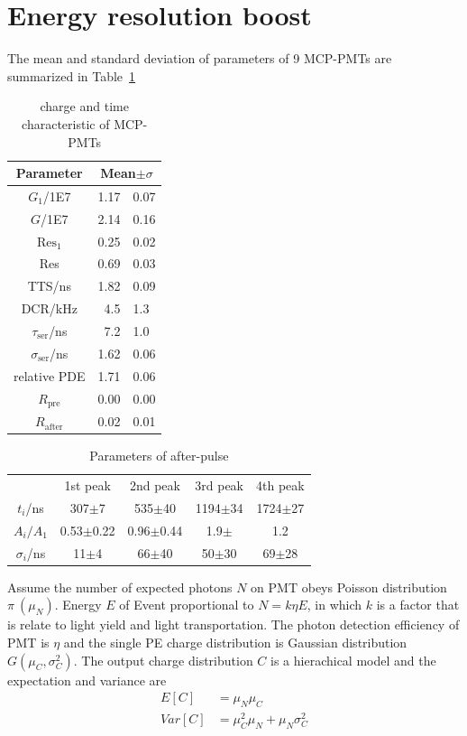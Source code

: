 \section{Energy resolution boost}
\label{Result}
The mean and standard deviation of parameters of 9 MCP-PMTs are summarized in Table~\ref{tab:summary}
\begin{table}
    \centering
    \caption{charge and time characteristic of MCP-PMTs}
    \label{tab:summary}
    \begin{tabular}{c| r @{$\pm$} l}
        Parameter&\multicolumn{2}{c}{Mean$\pm\sigma$}\\
        \hline
        $G_1$/1E7&1.17&0.07\\
        $G$/1E7&2.14&0.16\\
        $\mathrm{Res}_1$&0.25&0.02\\
        Res&0.69&0.03\\
        TTS/ns&1.82&0.09\\
        DCR/kHz&4.5&1.3\\
        $\tau_{\mathrm{ser}}$/ns&7.2&1.0\\
        $\sigma_{\mathrm{ser}}$/ns&1.62&0.06\\
        relative PDE&1.71&0.06\\
        $R_{\mathrm{pre}}$&0.00&0.00\\
        $R_{\mathrm{after}}$&0.02&0.01\\
        \hline
    \end{tabular}
\end{table}
\begin{table}
    \centering
    \caption{Parameters of after-pulse}
    \label{tab:afterpulse}
    \begin{tabular}{c|c|c|c|c}
        \hline
        &1st peak&2nd peak&3rd peak&4th peak\\
        $t_i$/ns&307$\pm$7&535$\pm$40&1194$\pm$34&1724$\pm$27\\
        $A_i/A_1$&0.53$\pm$0.22&0.96$\pm$0.44&1.9$\pm$&1.2\\
        $\sigma_i$/ns&11$\pm$4&66$\pm$40&50$\pm$30&69$\pm$28\\
        \hline
    \end{tabular}
\end{table}

Assume the number of expected photons $N$ on PMT obeys Poisson distribution $\pi~(\mu_N)$. Energy $E$ of Event proportional to $N=k\eta E$, in which $k$ is a factor that is relate to light yield and light transportation. The photon detection efficiency of PMT is $\eta$ and the single PE charge distribution is Gaussian distribution $G(\mu_C,\sigma_C^2)$. The output charge distribution $C$ is a hierachical model and the expectation and variance are
\begin{align}
    E[C]&=\mu_N\mu_C\\
    Var[C]&=\mu_C^2\mu_N+\mu_N\sigma_C^2
\end{align}

